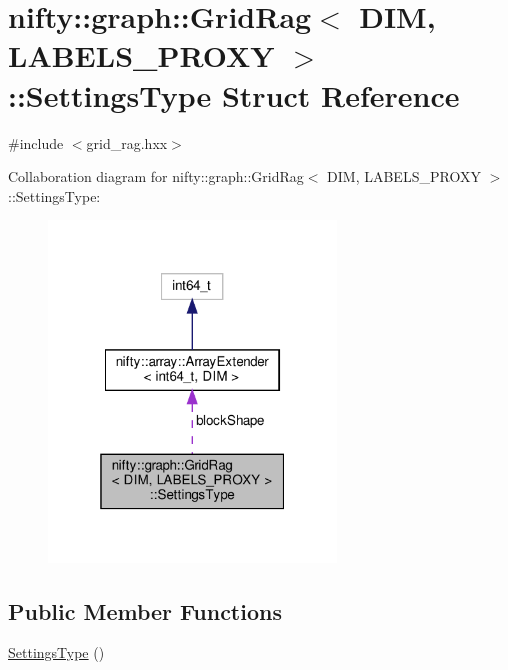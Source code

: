 \hypertarget{structnifty_1_1graph_1_1GridRag_1_1SettingsType}{}\section{nifty\+:\+:graph\+:\+:Grid\+Rag$<$ D\+IM, L\+A\+B\+E\+L\+S\+\_\+\+P\+R\+O\+XY $>$\+:\+:Settings\+Type Struct Reference}
\label{structnifty_1_1graph_1_1GridRag_1_1SettingsType}


{\ttfamily \#include $<$grid\+\_\+rag.\+hxx$>$}



Collaboration diagram for nifty\+:\+:graph\+:\+:Grid\+Rag$<$ D\+IM, L\+A\+B\+E\+L\+S\+\_\+\+P\+R\+O\+XY $>$\+:\+:Settings\+Type\+:
\nopagebreak
\begin{figure}[H]
\begin{center}
\leavevmode
\includegraphics[width=217pt]{structnifty_1_1graph_1_1GridRag_1_1SettingsType__coll__graph}
\end{center}
\end{figure}
\subsection*{Public Member Functions}
\begin{DoxyCompactItemize}
\item 
\hyperlink{structnifty_1_1graph_1_1GridRag_1_1SettingsType_a635006df3b75d3bbeaec306efef6ca8e}{Settings\+Type} ()
\end{DoxyCompactItemize}
